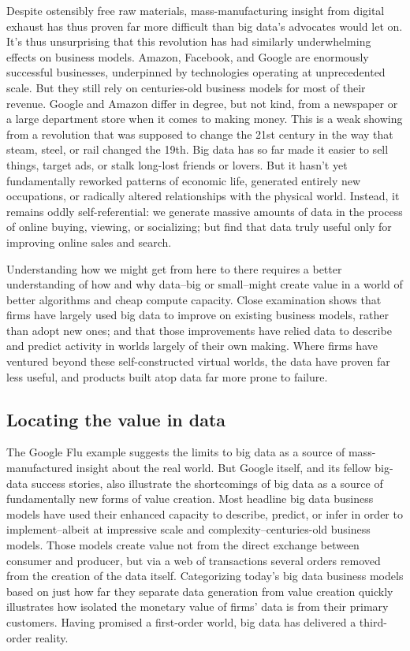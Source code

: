 \documentclass[12pt]{article}
\begin{document}
Despite ostensibly free raw materials, mass-manufacturing insight from
digital exhaust has thus proven far more difficult than big data's
advocates would let on. It's thus unsurprising that this revolution
has had similarly underwhelming effects on business models. Amazon,
Facebook, and Google are enormously successful businesses, underpinned
by technologies operating at unprecedented scale. But they still rely
on centuries-old business models for most of their revenue. Google and
Amazon differ in degree, but not kind, from a newspaper or a large
department store when it comes to making money. This is a weak showing
from a revolution that was supposed to change the 21st century in the
way that steam, steel, or rail changed the 19th. Big data has so far
made it easier to sell things, target ads, or stalk long-lost friends
or lovers. But it hasn't yet fundamentally reworked patterns of
economic life, generated entirely new occupations, or radically
altered relationships with the physical world. Instead, it remains
oddly self-referential: we generate massive amounts of data in the
process of online buying, viewing, or socializing; but find that data
truly useful only for improving online sales and search.

Understanding how we might get from here to there requires a better
understanding of how and why data--big or small--might create value in
a world of better algorithms and cheap compute capacity. Close
examination shows that firms have largely used big data to improve on
existing business models, rather than adopt new ones; and that those
improvements have relied data to describe and predict activity in
worlds largely of their own making. Where firms have ventured beyond
these self-constructed virtual worlds, the data have proven far less
useful, and products built atop data far more prone to failure. 


\subsection{Locating the value in data}
\label{sec:locating-value-data}


The Google Flu example suggests the limits to big data as a source of
mass-manufactured insight about the real world. But Google itself, and
its fellow big-data success stories, also illustrate the shortcomings
of big data as a source of fundamentally new forms of value creation. Most
headline big data business models have used their enhanced capacity to
describe, predict, or infer in order to implement--albeit at
impressive scale and complexity--centuries-old business models. Those
models create value not from the direct exchange between consumer and
producer, but via a web of transactions several orders removed from
the creation of the data itself. Categorizing today's big data
business models based on just how far they separate data generation
from value creation quickly illustrates how isolated the monetary
value of firms' data is from their primary customers. Having promised
a first-order world, big data has delivered a third-order
reality. 
\end{document}
